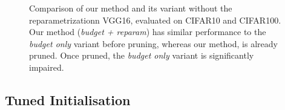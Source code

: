 \begin{figure}
  \centering
  \caption{Comparison of our method and its variant without the
    reparametrizationn VGG16, evaluated on CIFAR10 and CIFAR100. Our method
    (\emph{budget + reparam}) has similar performance to the \emph{budget only}
    variant before pruning, whereas our method, is already pruned. Once pruned,
    the \emph{budget only} variant is significantly impaired.}
  \label{fig:chap1:budget_only_vgg16}
\end{figure}



\subsection{Tuned Initialisation}
\label{sec:chap1:impact_of_fine_tuning}


